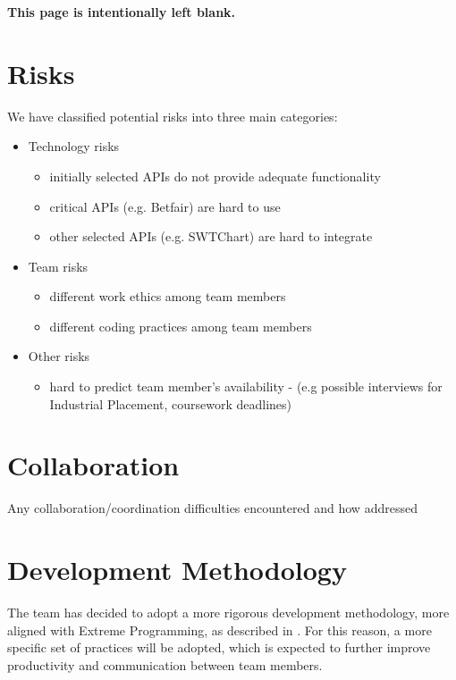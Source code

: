 \documentclass[10pt]{report}
\begin{document}
\pagebreak
{\bf This page is intentionally left blank.}
\pagebreak

\section{Risks}

We have classified potential risks into three main categories:
\begin{itemize}
\item Technology risks
	\begin{itemize}
		\item initially selected APIs do not provide adequate functionality
		\item critical APIs (e.g. Betfair) are hard to use
		\item other selected APIs (e.g. SWTChart) are hard to integrate
	\end{itemize}

	\item Team risks
		\begin{itemize}
		\item different work ethics among team members
		\item different coding practices among team members
	\end{itemize}

	\item Other risks
		\begin{itemize}
		\item hard to predict team member's availability - (e.g possible interviews for Industrial Placement, coursework deadlines)
	\end{itemize}

\end{itemize}

\section{Collaboration}
Any collaboration/coordination difficulties encountered and how addressed 

\section{Development Methodology}

The team has decided to adopt a more rigorous development methodology, more aligned with Extreme Programming, as described in \cite{extremep}.
For this reason, a more specific set of practices will be adopted, which is expected to further improve productivity and communication between team members.
\end{document}

